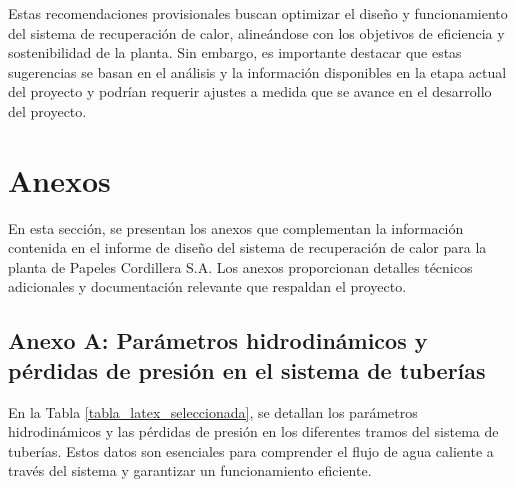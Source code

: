 \documentclass[11pt,a4paper]{article}  %
\begin{document}
Estas recomendaciones provisionales buscan optimizar el diseño y funcionamiento del sistema de recuperación de calor, alineándose con los objetivos de eficiencia y sostenibilidad de la planta. Sin embargo, es importante destacar que estas sugerencias se basan en el análisis y la información disponibles en la etapa actual del proyecto y podrían requerir ajustes a medida que se avance en el desarrollo del proyecto.

\section{Anexos}
En esta sección, se presentan los anexos que complementan la información contenida en el informe de diseño del sistema de recuperación de calor para la planta de Papeles Cordillera S.A. Los anexos proporcionan detalles técnicos adicionales y documentación relevante que respaldan el proyecto.

\subsection{Anexo A: Parámetros hidrodinámicos y pérdidas de presión en el sistema de tuberías}
En la Tabla \ref{tabla_latex_seleccionada}, se detallan los parámetros hidrodinámicos y las pérdidas de presión en los diferentes tramos del sistema de tuberías. Estos datos son esenciales para comprender el flujo de agua caliente a través del sistema y garantizar un funcionamiento eficiente.
\end{document}
